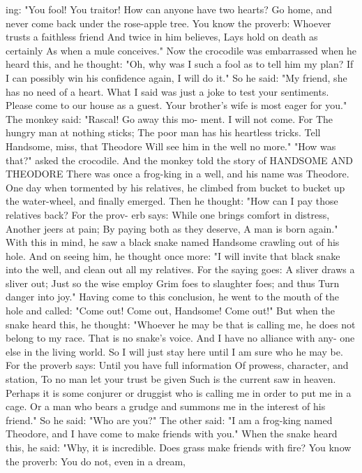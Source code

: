 \documentclass{book}
\begin{document}
ing: "You fool! You traitor! How can anyone have
two hearts? Go home, and never come back under
the rose-apple tree. You know the proverb:
Whoever trusts a faithless friend
And twice in him believes,
Lays hold on death as certainly
As when a mule conceives."
Now the crocodile was embarrassed when he
heard this, and he thought: "Oh, why was I such a
fool as to tell him my plan? If I can possibly win his
confidence again, I will do it." So he said: "My
friend, she has no need of a heart. What I said was
just a joke to test your sentiments. Please come to
our house as a guest. Your brother's wife is most
eager for you."
The monkey said: "Rascal! Go away this mo-
ment. I will not come. For
The hungry man at nothing sticks;
The poor man has his heartless tricks.
Tell Handsome, miss, that Theodore
Will see him in the well no more."
"How was that?" asked the crocodile. And the
monkey told the story of
HANDSOME AND THEODORE
There was once a frog-king in a well, and his name
was Theodore. One day when tormented by his
relatives, he climbed from bucket to bucket up the
water-wheel, and finally emerged. Then he thought:
"How can I pay those relatives back? For the prov-
erb says:
While one brings comfort in distress,
Another jeers at pain;
By paying both as they deserve,
A man is born again."
With this in mind, he saw a black snake named
Handsome crawling out of his hole. And on seeing
him, he thought once more: "I will invite that black
snake into the well, and clean out all my relatives.
For the saying goes:
A sliver draws a sliver out;
Just so the wise employ
Grim foes to slaughter foes; and thus
Turn danger into joy."
Having come to this conclusion, he went to the
mouth of the hole and called: "Come out! Come
out, Handsome! Come out!" But when the snake
heard this, he thought: "Whoever he may be that
is calling me, he does not belong to my race. That is
no snake's voice. And I have no alliance with any-
one else in the living world. So I will just stay here
until I am sure who he may be. For the proverb
says:
Until you have full information
Of prowess, character, and station,
To no man let your trust be given
Such is the current saw in heaven.
Perhaps it is some conjurer or druggist who is calling
me in order to put me in a cage. Or a man who bears
a grudge and summons me in the interest of his
friend."
So he said: "Who are you?" The other said: "I
am a frog-king named Theodore, and I have come
to make friends with you."
When the snake heard this, he said: "Why, it is
incredible. Does grass make friends with fire? You
know the proverb:
You do not, even in a dream,
\end{document}

